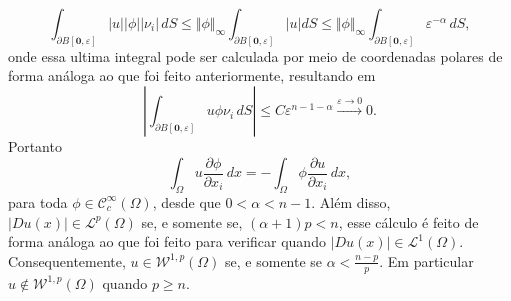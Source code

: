\documentclass[a4paper, 11pt]{book}
\theoremstyle{definition}
\newcommand{\cC}{\mathcal{C}}
\newcommand{\cL}{\mathcal{L}}
\newcommand{\cW}{\mathcal{W}}
\begin{document}
\begin{ex}
\[        %
        \int_{\partial B[\mathbf{0},\varepsilon]} |u| |\phi| |\nu_i| \,dS \leqslant \Vert \phi \Vert_{\infty}\int_{\partial B[\mathbf{0},\varepsilon]} |u|dS \leqslant \Vert \phi \Vert_{\infty}\int_{\partial B[\mathbf{0},\varepsilon]} \varepsilon^{-\alpha} \,dS,
    \]
    onde essa ultima integral pode ser calculada por meio de coordenadas polares de forma análoga ao que foi feito anteriormente, resultando em
    \[
        \left| \int_{\partial B[\mathbf{0},\varepsilon]} u \phi \nu_i \,dS \right| \leqslant C \varepsilon^{n-1-\alpha} \overset{\varepsilon \to 0}{\longrightarrow} 0.
    \]
    Portanto
    \[
        \int_{\Omega} u \dfrac{\partial \phi}{\partial x_i} \, dx = -\int_{\Omega} \phi \dfrac{\partial u}{\partial x_i} \,dx,
    \]
    para toda $\phi \in \cC^\infty_c(\Omega)$, desde que $0 < \alpha < n-1$. 
    Além disso, $|Du(x)| \in \cL^p(\Omega)$ se, e somente se, $(\alpha + 1)p < n$, esse cálculo é feito de forma análoga ao que foi feito para verificar quando $|Du(x)| \in \cL^1(\Omega)$. Consequentemente, $u \in \cW^{1,p}(\Omega)$ se, e somente se $\alpha < \frac{n-p}{p}$.
    Em particular $u \not\in \cW^{1,p}(\Omega)$ quando $p \geqslant n$.
\end{ex}
\end{document}
